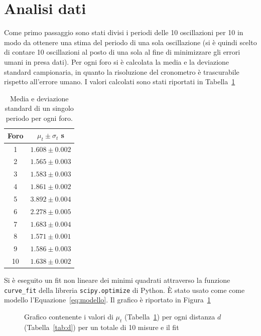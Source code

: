 \documentclass[a4paper,12pt]{article}
\begin{document}
\section{Analisi dati}

Come primo passaggio sono stati divisi i periodi delle 10 oscillazioni per 10 in modo da ottenere una stima del periodo di una sola oscillazione (si è quindi scelto di contare 10 oscillazioni al posto di una sola al fine di minimizzare gli errori umani in presa dati).
Per ogni foro si è calcolata la media e la deviazione standard campionaria, in quanto la risoluzione del cronometro è trascurabile rispetto all'errore umano. I valori calcolati sono stati riportati in Tabella~\ref{tab:periodi_med}

\begin{table}[h!]
\centering
\begin{tabular}{c c}
    \toprule 
    Foro & $\mu_t \pm \sigma_t$ s\\
    \midrule
    1 &  $1.608 \pm 0.002$ \\
    2 &  $1.565 \pm 0.003$ \\
    3 &  $1.583 \pm 0.003$ \\
    4 &  $1.861 \pm 0.002$ \\
    5 &  $3.892 \pm 0.004$ \\
    6 &  $2.278 \pm 0.005$ \\
    7 &  $1.683 \pm 0.004$ \\
    8 &  $1.571 \pm 0.001$ \\
    9 &  $1.586 \pm 0.003$ \\
    10 & $1.638 \pm 0.002$ \\
    \bottomrule
\end{tabular}
\caption{Media e deviazione standard di un singolo periodo per ogni foro.}%
\label{tab:periodi_med}
\end{table}

Si è eseguito un fit non lineare dei minimi quadrati attraverso la funzione \texttt{curve\_fit} della libreria \texttt{scipy.optimize} di Python. \`E stato usato come come modello l'Equazione~\ref{eq:modello}. Il grafico è riportato in Figura~\ref{fig:fit_10}

\begin{figure}
    \centering
    \resizebox{1\textwidth}{!}{%
        
    }
    \caption{Grafico contenente i valori di $\mu_t$ (Tabella~\ref{tab:periodi_med}) per ogni distanza $d$ (Tabella~\ref{tab:d}) per un totale di 10 misure e il fit}%
    \label{fig:fit_10}
\end{figure}
\end{document}
